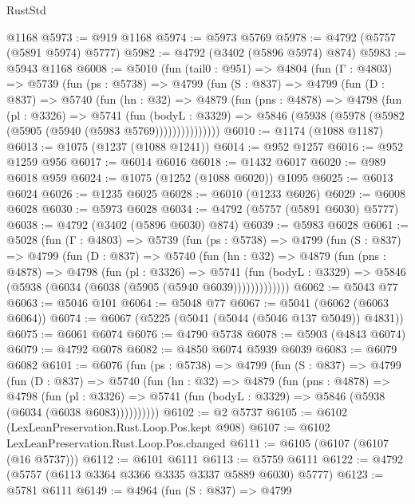 \begin{lexlean}{RustStd}
\begin{coremodule}
    @1168
@5973 := @919 @1168
@5974 := @5973 @5769
@5978 := @4792 (@5757 (@5891 @5974) @5777)
@5982 := @4792 (@3402 (@5896 @5974) @874)
@5983 := @5943 @1168
@6008 := @5010
    (fun (tail0 : @951) =>
    @4804
      (fun (Γ : @4803) =>
      @5739
        (fun (ps : @5738) =>
        @4799
          (fun (S : @837) =>
          @4799
            (fun (D : @837) =>
            @5740
              (fun (hn : @32) =>
              @4879
                (fun (pns : @4878) =>
                @4798
                  (fun (pl : @3326) =>
                  @5741
                    (fun (bodyL : @3329) =>
                    @5846 (@5938 (@5978 (@5982 (@5905 (@5940 (@5983 @5769)))))))))))))))
@6010 := @1174 (@1088 @1187)
@6013 := @1075 (@1237 (@1088 @1241))
@6014 := @952 @1257
@6016 := @952 @1259 @956
@6017 := @6014 @6016
@6018 := @1432 @6017
@6020 := @989 @6018 @959
@6024 := @1075 (@1252 (@1088 @6020)) @1095
@6025 := @6013 @6024
@6026 := @1235 @6025
@6028 := @6010 (@1233 @6026)
@6029 := @6008 @6028
@6030 := @5973 @6028
@6034 := @4792 (@5757 (@5891 @6030) @5777)
@6038 := @4792 (@3402 (@5896 @6030) @874)
@6039 := @5983 @6028
@6061 := @5028
    (fun (Γ : @4803) =>
    @5739
      (fun (ps : @5738) =>
      @4799
        (fun (S : @837) =>
        @4799
          (fun (D : @837) =>
          @5740
            (fun (hn : @32) =>
            @4879
              (fun (pns : @4878) =>
              @4798
                (fun (pl : @3326) =>
                @5741
                  (fun (bodyL : @3329) =>
                  @5846 (@5938 (@6034 (@6038 (@5905 (@5940 @6039)))))))))))))
@6062 := @5043 @77
@6063 := @5046 @101
@6064 := @5048 @77
@6067 := @5041 (@6062 (@6063 @6064))
@6074 := @6067 (@5225 (@5041 (@5044 (@5046 @137 @5049)) @4831))
@6075 := @6061 @6074
@6076 := @4790 @5738
@6078 := @5903 (@4843 @6074)
@6079 := @4792 @6078
@6082 := @4850 @6074 @5939 @6039
@6083 := @6079 @6082
@6101 := @6076
    (fun (ps : @5738) =>
    @4799
      (fun (S : @837) =>
      @4799
        (fun (D : @837) =>
        @5740
          (fun (hn : @32) =>
          @4879
            (fun (pns : @4878) =>
            @4798
              (fun (pl : @3326) =>
              @5741 (fun (bodyL : @3329) => @5846 (@5938 (@6034 (@6038 @6083))))))))))
@6102 := @2 @5737
@6105 := @6102 (LexLeanPreservation.Rust.Loop.Pos.kept @908)
@6107 := @6102 LexLeanPreservation.Rust.Loop.Pos.changed
@6111 := @6105 (@6107 (@6107 (@16 @5737)))
@6112 := @6101 @6111
@6113 := @5759 @6111
@6122 := @4792 (@5757 (@6113 @3364 @3366 @3335 @3337 @5889 @6030) @5777)
@6123 := @5781 @6111
@6149 := @4964
    (fun (S : @837) =>
    @4799

\end{coremodule}
\end{lexlean}
